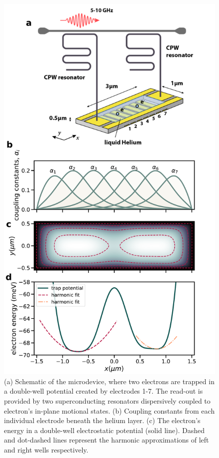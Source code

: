 \documentclass[twocolumn,superscriptaddress,unsortedaddress,
 amsmath,amssymb,
 aps,
]{revtex4-2}
\begin{document}
\begin{figure}
\includegraphics[width=\columnwidth]{figures/figure1.pdf}
\caption{\label{fig1} (a) Schematic of the microdevice, where two electrons are trapped in a double-well potential created by electrodes 1-7. The read-out is provided by two superconducting resonators dispersively coupled to  electron's in-plane motional states. (b) Coupling constants from each individual electrode beneath the helium layer. (c) The electron's energy in a  double-well electrostatic potential (solid line). Dashed and dot-dashed lines represent the harmonic approximations of left and right wells respectively.}
\end{figure}
\end{document}
